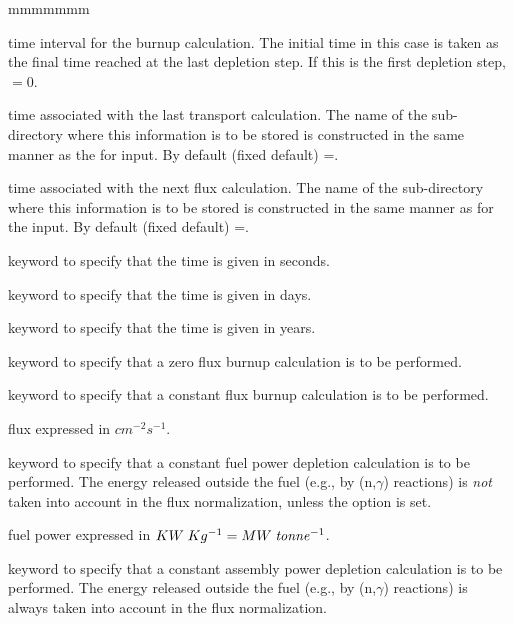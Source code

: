 \begin{ListeDeDescription}{mmmmmmm}
\item[\dusa{dxt}] time interval for the burnup calculation. The initial time  in
this case is taken as the final time reached at the last depletion step. If this is the first
depletion step,  $=0$.

\item[\dusa{xts}] time associated with the last transport calculation. The
name  of the sub-directory where this information is to be stored is constructed
in the same manner as the for  input. By default  (fixed default)
=.

\item[\dusa{xtr}] time associated with the next flux calculation. The name of
the sub-directory where this information is to be stored is constructed in the
same manner as for the  input. By default (fixed default)
=.

\item[\moc{S}] keyword to specify that the time is given in seconds.

\item[\moc{DAY}] keyword to specify that the time is given in days.

\item[\moc{YEAR}] keyword to specify that the time is given in years.

\item[\moc{COOL}] keyword to specify that a zero flux burnup calculation is to
be performed. 

\item[\moc{FLUX}] keyword to specify that a constant flux burnup
calculation is to be performed.  

\item[\dusa{flux}] flux expressed in $cm^{-2}s^{-1}$. 

\item[\moc{POWR}] keyword to specify that a constant fuel power depletion
calculation is to be performed. The energy released outside the fuel (e.g., by
(n,$\gamma$) reactions) is {\sl not} taken into account in the flux normalization,
unless the  option is set.

\item[\dusa{fpower}] fuel power expressed in $KW\;Kg^{-1}=MW\;{\it tonne}^{-1}$.

\item[\moc{W/CC}] keyword to specify that a constant assembly power depletion
calculation is to be performed. The energy released outside the fuel (e.g., by
(n,$\gamma$) reactions) is always taken into account in the flux normalization.


\end{ListeDeDescription}
